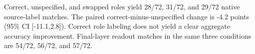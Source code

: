Correct, unspecified, and swapped roles yield 28/72, 31/72, and 29/72 native source-label matches. The paired correct-minus-unspecified change is -4.2 points (95\% CI [-11.1,2.8]). Correct role labeling does not yield a clear aggregate accuracy improvement. Final-layer readout matches in the same three conditions are 54/72, 56/72, and 57/72.
